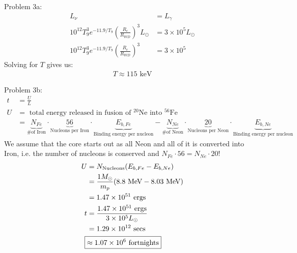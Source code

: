 \documentclass[10pt,letter,preprint]{aastex}
\newcommand{\rp}{\right)}
\newcommand{\lp}{\left(}
\begin{document}
\newpage
Problem 3a:\\
\begin{align}
L_{\nu} &= L_{\gamma}\\
10^{12}T_{9}^{3}e^{-11.9/T_{9}} \lp \frac{R_{c}}{R_{WD}} \rp^{3}L_{\odot} &= 3 \times 10^{5}L_{\odot}\\
10^{12}T_{9}^{3}e^{-11.9/T_{9}} \lp \frac{R_{c}}{R_{WD}} \rp^{3} &= 3 \times 10^{5}
\end{align}
Solving for $T$ gives us:
\begin{align}
\boxed{T \approx 115\textrm{ keV}}%
\end{align}

Problem 3b:\\
\begin{align}
t &= \frac{U}{L}\\
U &= \textrm{ total energy released in fusion of $^{20}$Ne into $^{56}$Fe}\\
&= \underbrace{N_{Fe}}_{\textrm{\# of Iron}} \cdot \underbrace{56}_{\textrm{Nucleons per Iron}} \cdot \underbrace{E_{b,Fe}}_{\textrm{Binding energy per nucleon}} - \underbrace{N_{Ne}}_{\textrm{\# of Neon}} \cdot \underbrace{20}_{\textrm{Nucleons per Neon}} \cdot \underbrace{E_{b,Ne}}_{\textrm{Binding energy per nucleon}}
\end{align}
We assume that the core starts out as all Neon and all of it is converted into Iron, i.e. the number of nucleons is conserved and $N_{Fe} \cdot 56 = N_{Ne} \cdot 20$!
\begin{align}
U &= N_{\textrm{Nucleons}} (E_{b,Fe} - E_{b,Ne})\\
&= \frac{1M_{\odot}}{m_{p}}(8.8 \textrm{ MeV} - 8.03 \textrm{ MeV})\\
&= 1.47 \times 10^{51}\textrm{ ergs}\\
t &= \frac{1.47 \times 10^{51}\textrm{ ergs}}{3 \times 10^{5} L_{\odot}}\\
&= 1.29 \times 10^{12}\textrm{ secs}\\
\Aboxed{&\approx 1.07 \times 10^{6} \textrm{ fortnights}} %
\end{align}
\end{document}
